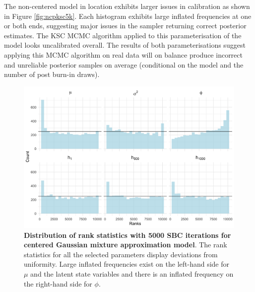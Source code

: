 \documentclass[12pt, a4paper]{article}
\begin{document}
    The non-centered model in location exhibits larger issues in calibration as shown in Figure \ref{fig:ncpksc5k}. Each histogram exhibits large inflated frequencies at one or both ends, suggesting major issues in the sampler returning correct posterior estimates. The KSC MCMC algorithm applied to this parameterisation of the model looks uncalibrated overall. The results of both parameterisations suggest applying this MCMC algorithm on real data will on balance produce incorrect and unreliable posterior samples on average (conditional on the model and the number of post burn-in draws).
    \begin{figure}[H]
        \centering
        \includegraphics[scale=0.09]{results/ksc_cp_5k.png}
        \caption{\textbf{Distribution of rank statistics with 5000 SBC iterations for centered Gaussian mixture approximation model}. The rank statistics for all the selected parameters display deviations from uniformity. Large inflated frequencies exist on the left-hand side for $\mu$ and the latent state variables and there is an inflated frequency on the right-hand side for $\phi$.}
        \label{fig:cpksc5k}
    \end{figure}
\end{document}
